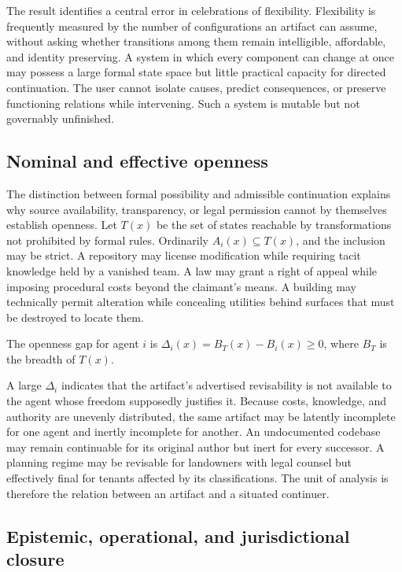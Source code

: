 The result identifies a central error in celebrations of flexibility. Flexibility is frequently measured by the number of configurations an artifact can assume, without asking whether transitions among them remain intelligible, affordable, and identity preserving. A system in which every component can change at once may possess a large formal state space but little practical capacity for directed continuation. The user cannot isolate causes, predict consequences, or preserve functioning relations while intervening. Such a system is mutable but not governably unfinished.

\subsection{Nominal and effective openness}

The distinction between formal possibility and admissible continuation explains why source availability, transparency, or legal permission cannot by themselves establish openness. Let $T(x)$ be the set of states reachable by transformations not prohibited by formal rules. Ordinarily $A_i(x)\subseteq T(x)$, and the inclusion may be strict. A repository may license modification while requiring tacit knowledge held by a vanished team. A law may grant a right of appeal while imposing procedural costs beyond the claimant's means. A building may technically permit alteration while concealing utilities behind surfaces that must be destroyed to locate them.

\begin{definition}
The openness gap for agent $i$ is $\Delta_i(x)=B_T(x)-B_i(x)\geq 0$, where $B_T$ is the breadth of $T(x)$.
\end{definition}

A large $\Delta_i$ indicates that the artifact's advertised revisability is not available to the agent whose freedom supposedly justifies it. Because costs, knowledge, and authority are unevenly distributed, the same artifact may be latently incomplete for one agent and inertly incomplete for another. An undocumented codebase may remain continuable for its original author but inert for every successor. A planning regime may be revisable for landowners with legal counsel but effectively final for tenants affected by its classifications. The unit of analysis is therefore the relation between an artifact and a situated continuer.

\subsection{Epistemic, operational, and jurisdictional closure}

